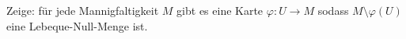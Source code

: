 \begin{exercise}
  Zeige: für jede Mannigfaltigkeit $M$ gibt es eine Karte $\varphi: U \to M$ sodass $M \setminus \varphi(U)$ eine Lebeque-Null-Menge ist.
\end{exercise}
